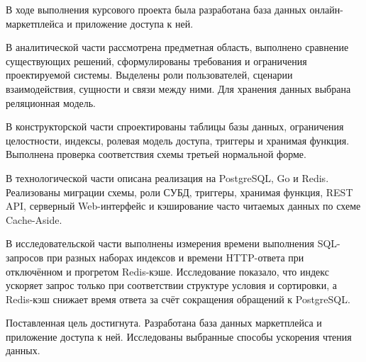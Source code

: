 

В ходе выполнения курсового проекта была разработана база данных онлайн-маркетплейса и приложение доступа к ней.

В аналитической части рассмотрена предметная область, выполнено сравнение существующих решений, сформулированы требования и ограничения проектируемой системы. Выделены роли пользователей, сценарии взаимодействия, сущности и связи между ними. Для хранения данных выбрана реляционная модель.

В конструкторской части спроектированы таблицы базы данных, ограничения целостности, индексы, ролевая модель доступа, триггеры и хранимая функция. Выполнена проверка соответствия схемы третьей нормальной форме.

В технологической части описана реализация на PostgreSQL, Go и Redis. Реализованы миграции схемы, роли СУБД, триггеры, хранимая функция, REST API, серверный Web-интерфейс и кэширование часто читаемых данных по схеме Cache-Aside.

В исследовательской части выполнены измерения времени выполнения SQL-запросов при разных наборах индексов и времени HTTP-ответа при отключённом и прогретом Redis-кэше. Исследование показало, что индекс ускоряет запрос только при соответствии структуре условия и сортировки, а Redis-кэш снижает время ответа за счёт сокращения обращений к PostgreSQL.

Поставленная цель достигнута. Разработана база данных маркетплейса и приложение доступа к ней. Исследованы выбранные способы ускорения чтения данных.

\clearpage
